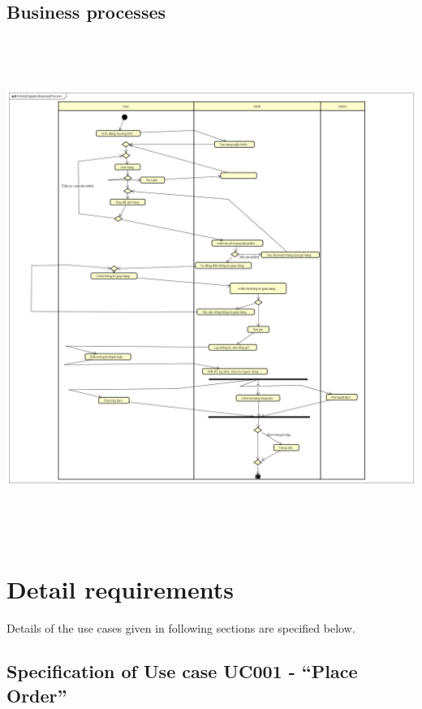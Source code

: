 \documentclass[letterpaper]{report}
\begin{document}
\section{Business processes \ \ \ \ \ \ \ \ }
\includegraphics[width=15.24cm,height=16.261cm]{UseCaseDiagram/ActivityDiagram-BusinessProcess.png}

\chapter{Detail requirements}
Details of the use cases given in following sections are specified below.
\bigskip

\section[Specification of Use case UC001 {}- “Place Order”]{Specification of Use case UC001 - “Place Order”}


\end{document}
